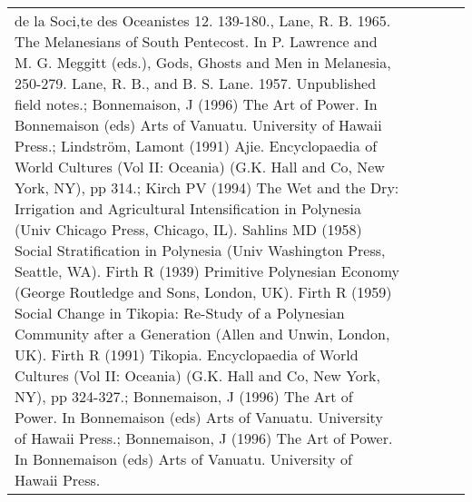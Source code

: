 \begin{longtable}{p{1.8cm}p{1.8cm}p{1.8cm}p{2cm}p{7cm}}
de la Soci‚te des Oceanistes 12. 139-180., Lane, R. B. 1965. The Melanesians of South Pentecost. In P. Lawrence and M. G. Meggitt (eds.), Gods, Ghosts and Men in Melanesia, 250-279. Lane, R. B., and B. S. Lane. 1957. Unpublished field notes.; Bonnemaison, J (1996) The Art of Power. In Bonnemaison (eds) Arts of Vanuatu. University of Hawaii Press.; Lindström, Lamont (1991) Ajie. Encyclopaedia of World Cultures (Vol II: Oceania) (G.K. Hall and Co, New York, NY), pp 314.; Kirch PV (1994) The Wet and the Dry: Irrigation and Agricultural Intensification in Polynesia (Univ Chicago Press, Chicago, IL). Sahlins MD (1958) Social Stratification in Polynesia (Univ Washington Press, Seattle, WA). Firth R (1939) Primitive Polynesian Economy (George Routledge and Sons, London, UK). Firth R (1959) Social Change in Tikopia: Re-Study of a Polynesian Community after a Generation (Allen and Unwin, London, UK). Firth R (1991) Tikopia. Encyclopaedia of World Cultures (Vol II: Oceania) (G.K. Hall and Co, New York, NY), pp 324-327.; Bonnemaison, J (1996) The Art of Power. In Bonnemaison (eds) Arts of Vanuatu. University of Hawaii Press.; Bonnemaison, J (1996) The Art of Power. In Bonnemaison (eds) Arts of Vanuatu. University of Hawaii Press. \\ 

\end{longtable}
